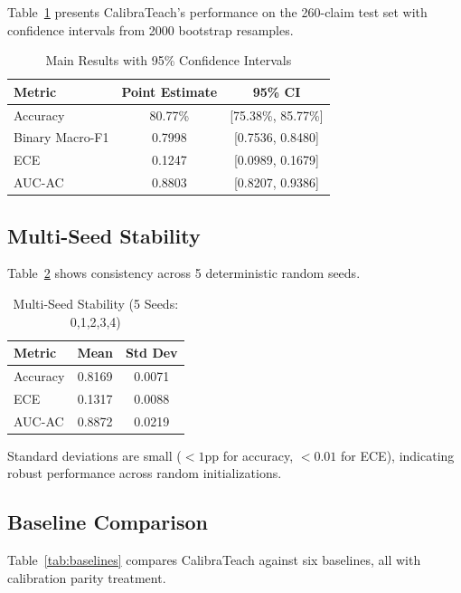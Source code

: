 \documentclass[journal]{IEEEtran}
\begin{document}
Table~\ref{tab:main_results} presents CalibraTeach's performance on the 260-claim test set with confidence intervals from 2000 bootstrap resamples.

\begin{table}[!t]
\centering
\caption{Main Results with 95\% Confidence Intervals}
\label{tab:main_results}
\begin{tabular}{lcc}
\toprule
\textbf{Metric} & \textbf{Point Estimate} & \textbf{95\% CI} \\
\midrule
Accuracy & 80.77\% & [75.38\%, 85.77\%] \\
Binary Macro-F1 & 0.7998 & [0.7536, 0.8480] \\
ECE & 0.1247 & [0.0989, 0.1679] \\
AUC-AC & 0.8803 & [0.8207, 0.9386] \\
\bottomrule
\end{tabular}
\end{table}

\subsection{Multi-Seed Stability}

Table~\ref{tab:multiseed} shows consistency across 5 deterministic random seeds.

\begin{table}[t]
\centering
\caption{Multi-Seed Stability (5 Seeds: 0,1,2,3,4)}
\label{tab:multiseed}
\begin{tabular}{lcc}
\toprule
\textbf{Metric} & \textbf{Mean} & \textbf{Std Dev} \\
\midrule
Accuracy & 0.8169 & 0.0071 \\
ECE & 0.1317 & 0.0088 \\
AUC-AC & 0.8872 & 0.0219 \\
\bottomrule
\end{tabular}
\end{table}

Standard deviations are small ($<1$pp for accuracy, $<0.01$ for ECE), indicating robust performance across random initializations.

\subsection{Baseline Comparison}

Table~\ref{tab:baselines} compares CalibraTeach against six baselines, all with calibration parity treatment.
\end{document}
